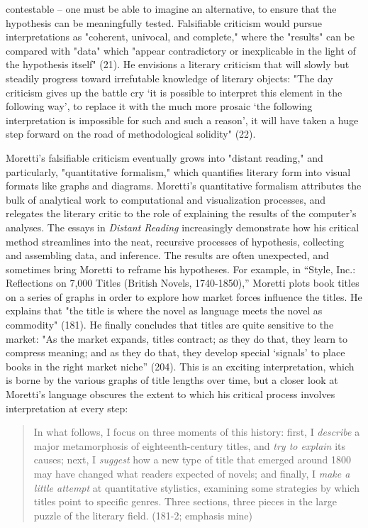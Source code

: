 \documentclass[11pt]{article}
\begin{document}
contestable -- one must be able to imagine an alternative, to ensure
that the hypothesis can be meaningfully tested. Falsifiable criticism
would pursue interpretations as "coherent, univocal, and complete,"
where the "results" can be compared with "data" which "appear
contradictory or inexplicable in the light of the hypothesis itself"
(21). He envisions a literary criticism that will slowly but steadily
progress toward irrefutable knowledge of literary objects: "The day
criticism gives up the battle cry ‘it is possible to interpret this
element in the following way’, to replace it with the much more
prosaic ‘the following interpretation is impossible for such and such
a reason’, it will have taken a huge step forward on the road of
methodological solidity" (22).

Moretti's falsifiable criticism eventually grows into "distant
reading," and particularly, "quantitative formalism," which quantifies
literary form into visual formats like graphs and diagrams. Moretti's
quantitative formalism attributes the bulk of analytical work to
computational and visualization processes, and relegates the literary
critic to the role of explaining the results of the computer's
analyses. The essays in \emph{Distant Reading} increasingly demonstrate how
his critical method streamlines into the neat, recursive processes of
hypothesis, collecting and assembling data, and inference. The results
are often unexpected, and sometimes bring Moretti to reframe his
hypotheses. For example, in “Style, Inc.: Reflections on 7,000 Titles
(British Novels, 1740-1850),” Moretti plots book titles on a series of
graphs in order to explore how market forces influence the titles. He
explains that "the title is where the novel as language meets the novel
as commodity" (181). He finally concludes that titles are quite
sensitive to the market: "As the market expands, titles contract; as
they do that, they learn to compress meaning; and as they do that,
they develop special ‘signals’ to place books in the right market
niche” (204). This is an exciting interpretation, which is borne by
the various graphs of title lengths over time, but a closer look at
Moretti's language obscures the extent to which his critical process
involves interpretation at every step:
\begin{quote}
In what follows, I focus on three moments of this history: first, I
\emph{describe} a major metamorphosis of eighteenth-century titles, and
\emph{try to explain} its causes; next, I \emph{suggest} how a new type of title
that emerged around 1800 may have changed what readers expected of
novels; and finally, I \emph{make a little attempt} at quantitative
stylistics, examining some strategies by which titles point to
specific genres. Three sections, three pieces in the large puzzle of
the literary field. (181-2; emphasis mine)
\end{quote}
\end{document}
